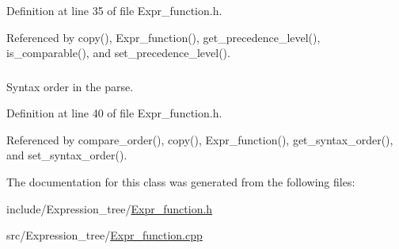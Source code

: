 Definition at line 35 of file Expr\_\-function.h.

Referenced by copy(), Expr\_\-function(), get\_\-precedence\_\-level(), is\_\-comparable(), and set\_\-precedence\_\-level().\hypertarget{classgenevalmag_1_1Expr__function_dfde16cebcb1963e540a8f92eddb69a1}{
\subsubsection[{syntax\_\-order}]{}}
\label{classgenevalmag_1_1Expr__function_dfde16cebcb1963e540a8f92eddb69a1}


Syntax order in the parse. 



Definition at line 40 of file Expr\_\-function.h.

Referenced by compare\_\-order(), copy(), Expr\_\-function(), get\_\-syntax\_\-order(), and set\_\-syntax\_\-order().

The documentation for this class was generated from the following files:\begin{CompactItemize}
\item 
include/Expression\_\-tree/\hyperlink{Expr__function_8h}{Expr\_\-function.h}\item 
src/Expression\_\-tree/\hyperlink{Expr__function_8cpp}{Expr\_\-function.cpp}\end{CompactItemize}
